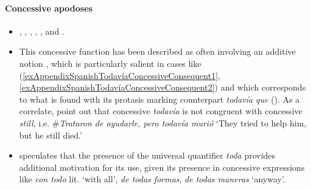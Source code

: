\pagebreak
\paragraph{Concessive apodoses}
\label{appendixSpanishTodaviaConsessiveConsequent}
\begin{itemize}
	\item \textcite{Bosque2016}, \textcite{Cid1999}, \textcite{Deloor2012}, \textcite{EderlyCurco2016}, \textcite{Garrido1993}, \textcite{Morera1999} and \textcite[§30.8ñ]{RAEGramatica}.
	\item This concessive function has been described as often involving an additive notion \parencite[§30.8ñ]{RAEGramatica}, which is particularly salient in cases like (\ref{exAppendixSpanishTodavíaConcessiveConsequent1}, \ref{exAppendixSpanishTodavíaConcessiveConsequent2}) and which corresponds to what is found with its protasis marking counterpart \textit{todavía que} ().	As a correlate, \textcite{EderlyCurco2016} point out that concessive \textit{todavía} is not congruent with concessive \textit{still}, i.e. \#\textit{Trataron de ayudarle, pero todavía murió} \lq They tried to help him, but he still died.'
	\item \textcite{Bosque2016} speculates that the presence of the universal quantifier \textit{toda} provides additional motivation for its use, given its presence in concessive expressions like \textit{con todo} lit. \lq{}with all', \textit{de todas formas}, \textit{de todas maneras} \lq anyway'. 
\end{itemize}
